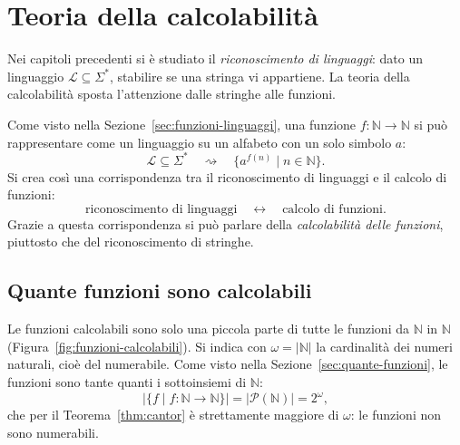 \documentclass[a4paper, 11pt, oneside]{book}
\theoremstyle{formale}
\begin{document}
    \chapter{Teoria della calcolabilit\`a}
    \label{chap:calcolabilita}
    Nei capitoli precedenti si \`e studiato il \emph{riconoscimento di linguaggi}: dato
    un linguaggio $\mathcal{L} \subseteq \Sigma^*$, stabilire se una stringa vi
    appartiene. La teoria della calcolabilit\`a sposta l'attenzione dalle stringhe alle
    funzioni.

    Come visto nella Sezione~\ref{sec:funzioni-linguaggi}, una funzione
    $f \colon \mathbb{N} \to \mathbb{N}$ si pu\`o rappresentare come un linguaggio su un
    alfabeto con un solo simbolo $a$:
    \begin{equation*}
        \mathcal{L} \subseteq \Sigma^*
        \quad\rightsquigarrow\quad
        \{a^{f(n)} \mid n \in \mathbb{N}\}.
    \end{equation*}
    Si crea cos\`i una corrispondenza tra il riconoscimento di linguaggi e il calcolo di
    funzioni:
    \begin{equation*}
        \text{riconoscimento di linguaggi}
        \quad\longleftrightarrow\quad
        \text{calcolo di funzioni}.
    \end{equation*}
    Grazie a questa corrispondenza si pu\`o parlare della \emph{calcolabilit\`a delle
    funzioni}, piuttosto che del riconoscimento di stringhe.

    \section{Quante funzioni sono calcolabili}
    \label{sec:quante-calcolabili}
    Le funzioni calcolabili sono solo una piccola parte di tutte le funzioni da
    $\mathbb{N}$ in $\mathbb{N}$ (Figura~\ref{fig:funzioni-calcolabili}). Si indica con
    $\omega = |\mathbb{N}|$ la cardinalit\`a dei numeri naturali, cio\`e del numerabile.
    Come visto nella Sezione~\ref{sec:quante-funzioni}, le funzioni sono tante quanti i
    sottoinsiemi di $\mathbb{N}$:
    \begin{equation*}
        |\{f \mid f \colon \mathbb{N} \to \mathbb{N}\}| = |\mathcal{P}(\mathbb{N})|
        = 2^\omega,
    \end{equation*}
    che per il Teorema~\ref{thm:cantor} \`e strettamente maggiore di $\omega$: le
    funzioni non sono numerabili.
\end{document}
